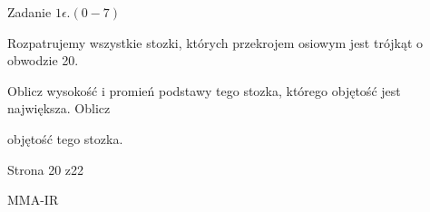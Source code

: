 \documentclass[a4paper,12pt]{article}
\begin{document}
Zadanie $1\epsilon. (0-7)$

Rozpatrujemy wszystkie stozki, których przekrojem osiowym jest trójkąt o obwodzie 20.

Oblicz wysokość i promień podstawy tego stozka, którego objętość jest największa. Oblicz

objętość tego stozka.

Strona 20 z22

MMA-IR
\end{document}
